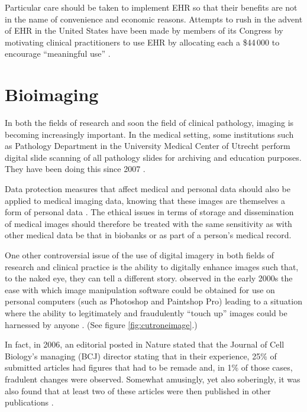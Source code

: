 \documentclass[british,a4paper, 12pt]{article}
\begin{document}
Particular care should be taken to implement EHR so that their benefits are not in the 
name of convenience and economic reasons. Attempts to rush in the advent of EHR in the 
United States have been made by members of its Congress by motivating clinical 
practitioners to use EHR  by allocating each a \$44\,000 to encourage ``meaningful use'' 
\parencite{jha2010meaningful}.

\section{Bioimaging}
In both the fields of research and soon the field of clinical pathology, imaging is becoming 
increasingly important. In the medical setting, some institutions such as Pathology Department 
in the University Medical Center of Utrecht perform digital slide scanning of all pathology 
slides for archiving and education purposes. They have been doing this since 2007
\parencite{stathonikos2013going}.

Data protection measures that affect medical and personal data should also be 
applied to medical imaging data, knowing that these images are themselves a form 
of personal data \parencite{duquenoy2008considering}. The ethical issues in terms of storage
and dissemination of medical images should therefore be treated with the same
sensitivity as with other medical data be that in biobanks or as part of a person's
medical record.

One other controversial issue of the use of digital imagery in both fields of research and 
clinical practice is the ability to digitally enhance images such that, to the naked eye, they 
can tell a different story. \citeauthor*{cutrone2001true} observed in the early 2000s the ease 
with which image manipulation software could be obtained for use on personal computers  (such as 
Photoshop and Paintshop Pro) leading to a situation where the ability to legitimately and 
fraudulently ``touch up'' images could be harnessed by anyone \parencite{cutrone2001true}. (See
figure \ref{fig:cutroneimage}.)

In fact, in 2006, an editorial posted in Nature stated that the Journal of Cell Biology's
managing (BCJ) director stating that in their experience, 25\% of submitted articles had figures that
had to be remade and, in 1\% of those cases, fradulent changes were observed. Somewhat amusingly,
yet also soberingly, it was also found that at least two of these articles were then published
in other publications \parencite{cromey2009digital}.
\end{document}
